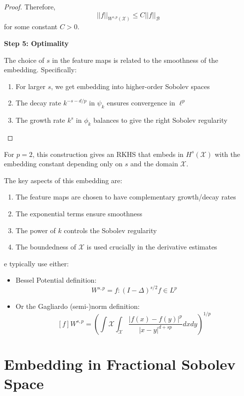 \begin{proof}
Therefore,
\begin{equation}
||f||_{W^{s,p}(\mathcal{X})} \leq C ||f||_{\mathcal{B}}
\end{equation}
for some constant $C > 0$.

\textbf{Step 5: Optimality}

The choice of $s$ in the feature maps is related to the smoothness of the embedding. Specifically:
\begin{enumerate}
\item For larger $s$, we get embedding into higher-order Sobolev spaces
\item The decay rate $k^{-s-d/p}$ in $\psi_k$ ensures convergence in $\ell^p$
\item The growth rate $k^s$ in $\phi_k$ balances to give the right Sobolev regularity
\end{enumerate}
\end{proof}

\begin{corollary}
For $p=2$, this construction gives an RKHS that embeds in $H^s(\mathcal{X})$ with the embedding constant depending only on $s$ and the domain $\mathcal{X}$.
\end{corollary}

\begin{remark}
The key aspects of this embedding are:
\begin{enumerate}
\item The feature maps are chosen to have complementary growth/decay rates
\item The exponential terms ensure smoothness
\item The power of $k$ controls the Sobolev regularity
\item The boundedness of $\mathcal{X}$ is used crucially in the derivative estimates
\end{enumerate}
\end{remark}

e typically use either:
\begin{itemize}
    \item Bessel Potential definition:
\[
W^{s,p} = {f: (I-\Delta)^{s/2}f \in L^p}
\]
    \item Or the Gagliardo (semi-)norm definition:
\[
[f]{W^{s,p}} = \left(\int{\mathcal{X}}\int_{\mathcal{X}} \frac{|f(x)-f(y)|^p}{|x-y|^{d+sp}} dx dy\right)^{1/p}
\]

\end{itemize}

\section{Embedding in Fractional Sobolev Space}

